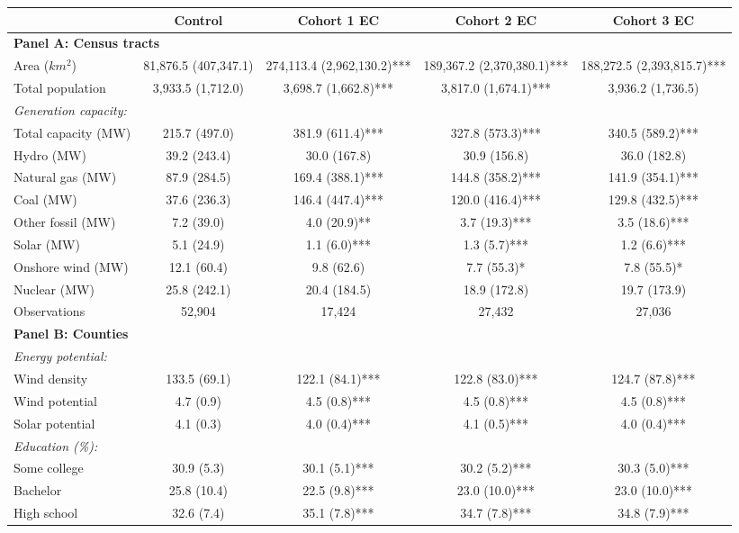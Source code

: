 \begin{tabular}{l*{4}{c}}
\toprule
 & Control & Cohort 1 EC & Cohort 2 EC & Cohort 3 EC \\
\midrule
\multicolumn{5}{l}{\textbf{Panel A: Census tracts}} \\
Area ($ km^2$) & 81,876.5 (407,347.1) & 274,113.4 (2,962,130.2)*** & 189,367.2 (2,370,380.1)*** & 188,272.5 (2,393,815.7)*** \\
Total population & 3,933.5 (1,712.0) & 3,698.7 (1,662.8)*** & 3,817.0 (1,674.1)*** & 3,936.2 (1,736.5) \\
\quad \emph{Generation capacity:} & & & & \\
Total capacity (MW) & 215.7 (497.0) & 381.9 (611.4)*** & 327.8 (573.3)*** & 340.5 (589.2)*** \\
Hydro (MW) & 39.2 (243.4) & 30.0 (167.8) & 30.9 (156.8) & 36.0 (182.8) \\
Natural gas (MW) & 87.9 (284.5) & 169.4 (388.1)*** & 144.8 (358.2)*** & 141.9 (354.1)*** \\
Coal (MW) & 37.6 (236.3) & 146.4 (447.4)*** & 120.0 (416.4)*** & 129.8 (432.5)*** \\
Other fossil (MW) & 7.2 (39.0) & 4.0 (20.9)** & 3.7 (19.3)*** & 3.5 (18.6)*** \\
Solar (MW) & 5.1 (24.9) & 1.1 (6.0)*** & 1.3 (5.7)*** & 1.2 (6.6)*** \\
Onshore wind (MW) & 12.1 (60.4) & 9.8 (62.6) & 7.7 (55.3)* & 7.8 (55.5)* \\
Nuclear (MW) & 25.8 (242.1) & 20.4 (184.5) & 18.9 (172.8) & 19.7 (173.9) \\
Observations & 52,904 & 17,424 & 27,432 & 27,036 \\
\midrule
\multicolumn{5}{l}{\textbf{Panel B: Counties}} \\
\quad \emph{Energy potential:} & & & & \\
Wind density & 133.5 (69.1) & 122.1 (84.1)*** & 122.8 (83.0)*** & 124.7 (87.8)*** \\
Wind potential & 4.7 (0.9) & 4.5 (0.8)*** & 4.5 (0.8)*** & 4.5 (0.8)*** \\
Solar potential & 4.1 (0.3) & 4.0 (0.4)*** & 4.1 (0.5)*** & 4.0 (0.4)*** \\
\quad \emph{Education (\%):} & & & & \\
Some college & 30.9 (5.3) & 30.1 (5.1)*** & 30.2 (5.2)*** & 30.3 (5.0)*** \\
Bachelor & 25.8 (10.4) & 22.5 (9.8)*** & 23.0 (10.0)*** & 23.0 (10.0)*** \\
High school & 32.6 (7.4) & 35.1 (7.8)*** & 34.7 (7.8)*** & 34.8 (7.9)*** \\

\end{tabular}
